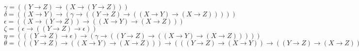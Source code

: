 \begin{ans}
{    $\gamma = ((Y \rightarrow Z) \rightarrow (X \rightarrow (Y \rightarrow Z)))$ \\
    $\delta = ((X \rightarrow Y) \rightarrow ( \gamma  \rightarrow ((Y \rightarrow Z) \rightarrow ((X \rightarrow Y) \rightarrow (X \rightarrow Z)))))$ \\
    $\epsilon = ((X \rightarrow (Y \rightarrow Z)) \rightarrow ((X \rightarrow Y) \rightarrow (X \rightarrow Z)))$ \\
    $\zeta = ( \epsilon  \rightarrow ((Y \rightarrow Z) \rightarrow  \epsilon ))$ \\
    $\eta = (((Y \rightarrow Z) \rightarrow  \epsilon ) \rightarrow ( \gamma  \rightarrow ((Y \rightarrow Z) \rightarrow ((X \rightarrow Y) \rightarrow (X \rightarrow Z)))))$ \\
    $\theta = (((Y \rightarrow Z) \rightarrow ((X \rightarrow Y) \rightarrow (X \rightarrow Z))) \rightarrow (((Y \rightarrow Z) \rightarrow (X \rightarrow Y)) \rightarrow ((Y \rightarrow Z) \rightarrow (X \rightarrow Z))))$\\
    
}
\end{ans}

